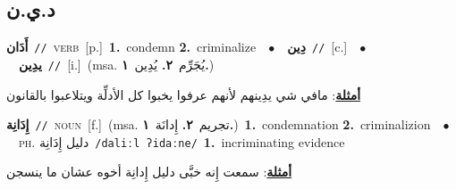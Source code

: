 \documentclass[10pt,a4paper,twoside]{article} %
\begin{document}
\begin{multicols}{2}
\vspace{-3mm}
\subsection*{\color{blue}\foreignlanguage{arabic}{د.ي.ن}\color{blue}{}} 

{\setlength\topsep{0pt}\textbf{\foreignlanguage{arabic}{أَدَان}}\ {\color{gray}\texttt{//}\color{black}}\ \textsc{verb}\ [p.]\ \textbf{1.}~condemn  \textbf{2.}~criminalize\ \ $\bullet$\ \ \setlength\topsep{0pt}\textbf{\foreignlanguage{arabic}{دِين}}\ {\color{gray}\texttt{//}\color{black}}\ [c.]\ \ $\bullet$\ \ \setlength\topsep{0pt}\textbf{\foreignlanguage{arabic}{يدِين}}\ {\color{gray}\texttt{//}\color{black}}\ [i.]\ \color{gray}(msa. \foreignlanguage{arabic}{يُجَرِّم}~\foreignlanguage{arabic}{\textbf{٢.}}  \foreignlanguage{arabic}{يُدِين}~\foreignlanguage{arabic}{\textbf{١.}})\color{black}\  \begin{flushright}\color{gray}\foreignlanguage{arabic}{\textbf{\underline{\foreignlanguage{arabic}{أمثلة}}}: مافي شي يدِينهم لأنهم عرفوا يخبوا كل الأدلِّة ويتلاعبوا بالقانون}\end{flushright}\color{black}} \vspace{2mm}

{\setlength\topsep{0pt}\textbf{\foreignlanguage{arabic}{إِدَانِة}}\ {\color{gray}\texttt{//}\color{black}}\ \textsc{noun}\ [f.]\ \color{gray}(msa. \foreignlanguage{arabic}{تجريم}~\foreignlanguage{arabic}{\textbf{٢.}}  \foreignlanguage{arabic}{إِدانَة}~\foreignlanguage{arabic}{\textbf{١.}})\color{black}\ \textbf{1.}~condemnation  \textbf{2.}~criminalizion\ \ $\bullet$\ \ \textsc{ph.} \color{gray} \foreignlanguage{arabic}{دليل إِدَانِة}\color{black}\ {\color{gray}\texttt{/{\sffamily daliːl ʔidaːne}/}\color{black}}\ \textbf{1.}~incriminating evidence\  \begin{flushright}\color{gray}\foreignlanguage{arabic}{\textbf{\underline{\foreignlanguage{arabic}{أمثلة}}}: سمعت إِنه خبَّى دليل إِدانِة أخوه عشان ما ينسجن}\end{flushright}\color{black}} \vspace{2mm}


\end{multicols}
\end{document}
